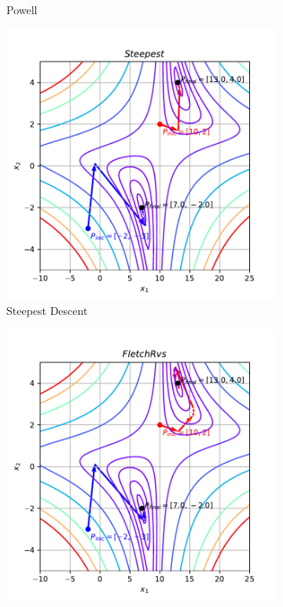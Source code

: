 \documentclass[10pt, a4paper]{article}
\begin{document}
\begin{figure}[htpb]
\begin{subfigure}[b]{0.32\textwidth}
    \caption{Powell}
    \label{fig:q1b_powell}
  \end{subfigure}
  \hfill
  \begin{subfigure}[b]{0.32\textwidth}
    \centering
    \includegraphics[width=\textwidth]{images/q1b_Steepest.pdf}
    \caption{Steepest Descent}
    \label{fig:q1b_steepest}
  \end{subfigure}
  \hfill
  \begin{subfigure}[b]{0.32\textwidth}
    \centering
    \includegraphics[width=\textwidth]{images/q1b_FletchRvs.pdf}

\end{subfigure}
\end{figure}
\end{document}
